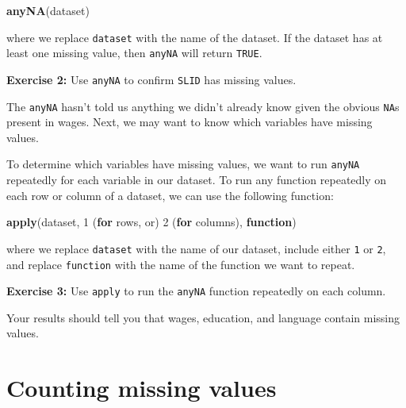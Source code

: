 \documentclass[
]{book}
\makeatletter
\newenvironment{Shaded}{\begin{snugshade}}{\end{snugshade}}
\newcommand{\ControlFlowTok}[1]{\textcolor[rgb]{0.27,0.27,0.27}{\textbf{#1}}}
\newcommand{\DecValTok}[1]{\textcolor[rgb]{0.06,0.06,0.06}{#1}}
\newcommand{\FunctionTok}[1]{\textcolor[rgb]{0.27,0.27,0.27}{\textbf{#1}}}
\newcommand{\NormalTok}[1]{#1}
\newenvironment{kframe}{%
\medskip{}
\setlength{\fboxsep}{.8em}
 \def\at@end@of@kframe{}%
 \ifinner\ifhmode%
  \def\at@end@of@kframe{\end{minipage}}%
  \begin{minipage}{\columnwidth}%
 \fi\fi%
 \def\FrameCommand##1{\hskip\@totalleftmargin \hskip-\fboxsep
 \colorbox{shadecolor}{##1}\hskip-\fboxsep
     \hskip-\linewidth \hskip-\@totalleftmargin \hskip\columnwidth}%
 \MakeFramed {\advance\hsize-\width
   \@totalleftmargin\z@ \linewidth\hsize
   \@setminipage}}%
 {\par\unskip\endMakeFramed%
 \at@end@of@kframe}
\renewenvironment{Shaded}{\begin{kframe}}{\end{kframe}}
\newenvironment{rmdblock}[1]
  {\begin{shaded*}
  }
  {\end{shaded*}
  }
\newenvironment{learncheck}
  {\begin{rmdblock}{warning}}
  {\end{rmdblock}}
\makeatother
\begin{document}
\begin{Shaded}
\begin{Highlighting}[]
\FunctionTok{anyNA}\NormalTok{(dataset)}
\end{Highlighting}
\end{Shaded}

where we replace \texttt{dataset} with the name of the dataset. If the dataset has at least one missing value, then \texttt{anyNA} will return \texttt{TRUE}.

\begin{learncheck}
\textbf{Exercise 2:} Use \texttt{anyNA} to confirm \texttt{SLID} has
missing values.
\end{learncheck}

The \texttt{anyNA} hasn't told us anything we didn't already know given the obvious \texttt{NA}s present in wages. Next, we may want to know which variables have missing values.

To determine which variables have missing values, we want to run \texttt{anyNA} repeatedly for each variable in our dataset. To run any function repeatedly on each row or column of a dataset, we can use the following function:

\begin{Shaded}
\begin{Highlighting}[]
\FunctionTok{apply}\NormalTok{(dataset, }\DecValTok{1}\NormalTok{ (}\ControlFlowTok{for}\NormalTok{ rows, or) }\DecValTok{2}\NormalTok{ (}\ControlFlowTok{for}\NormalTok{ columns), }\ControlFlowTok{function}\NormalTok{)}
\end{Highlighting}
\end{Shaded}

where we replace \texttt{dataset} with the name of our dataset, include either \texttt{1} or \texttt{2}, and replace \texttt{function} with the name of the function we want to repeat.

\begin{learncheck}
\textbf{Exercise 3:} Use \texttt{apply} to run the \texttt{anyNA}
function repeatedly on each column.
\end{learncheck}

Your results should tell you that wages, education, and language contain missing values.

\hypertarget{counting-missing-values}{%
\section{Counting missing values}\label{counting-missing-values}}
\end{document}
